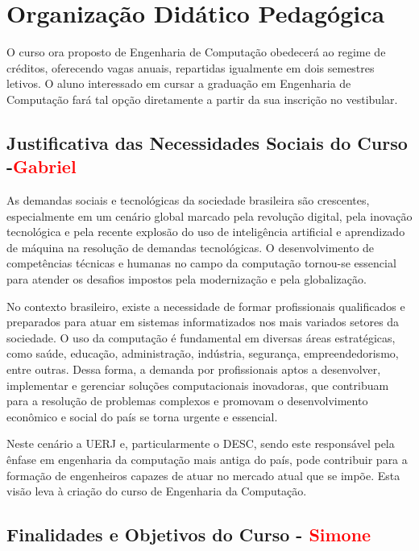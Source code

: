 
\chapter{Organização Didático Pedagógica}

O curso ora proposto de Engenharia de Computação obedecerá ao regime de créditos, oferecendo \vagas vagas anuais, repartidas igualmente em dois semestres letivos. O aluno interessado em cursar a graduação em Engenharia de Computação fará tal opção diretamente a partir da sua inscrição no vestibular.




\section{Justificativa das Necessidades Sociais do Curso -\textcolor{red}{Gabriel}}

As demandas sociais e tecnológicas da sociedade brasileira são crescentes, especialmente em um cenário global marcado pela revolução digital, pela inovação tecnológica e pela recente explosão do uso de inteligência artificial e aprendizado de máquina na resolução de demandas tecnológicas. O desenvolvimento de competências técnicas e humanas no campo da computação tornou-se essencial para atender os desafios impostos pela modernização e pela globalização.

No contexto brasileiro, existe a necessidade de formar profissionais qualificados e preparados para atuar em sistemas informatizados nos mais variados setores da sociedade. O uso da computação é fundamental em diversas áreas estratégicas, como saúde, educação, administração, indústria, segurança, empreendedorismo, entre outras. Dessa forma, a demanda por profissionais aptos a desenvolver, implementar e gerenciar soluções computacionais inovadoras, que contribuam para a resolução de problemas complexos e promovam o desenvolvimento econômico e social do país se torna urgente e essencial.

Neste cenário a UERJ e, particularmente o DESC, sendo este responsável pela ênfase em engenharia da computação mais antiga do país, pode contribuir para a formação de engenheiros capazes de atuar no mercado atual que se impõe. Esta visão leva à criação do curso de Engenharia da Computação.

\section{Finalidades e Objetivos do Curso - \textcolor{red}{Simone}}

